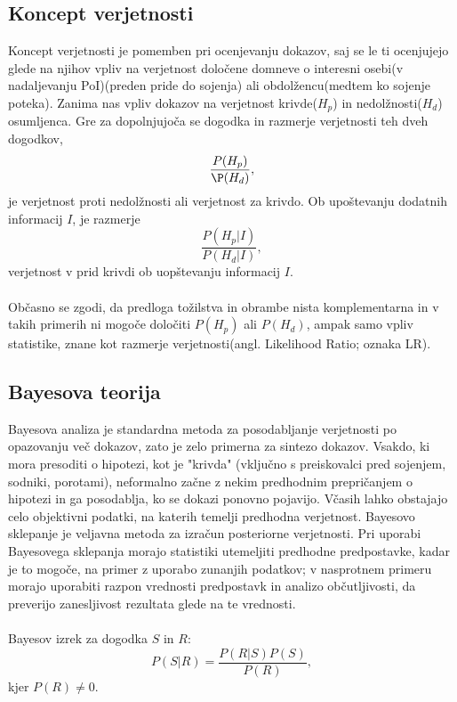 \documentclass[12pt,a4paper]{amsart}
\theoremstyle{definition} %
\theoremstyle{plain} %
\begin{document}
\subsection{Koncept verjetnosti}
Koncept verjetnosti je pomemben pri ocenjevanju dokazov, saj se le ti ocenjujejo glede na njihov vpliv na verjetnost določene domneve o interesni 
osebi(v nadaljevanju PoI)(preden pride do sojenja) ali obdolžencu(medtem ko sojenje poteka). Zanima nas vpliv dokazov na verjetnost krivde($H_p$) in 
nedolžnosti($H_d$) osumljenca. Gre za dopolnjujoča se dogodka in razmerje verjetnosti teh dveh dogodkov, 
\[
    \frac{P(H_p)}{\P(H_d)},
\]
je verjetnost proti nedolžnosti ali verjetnost za krivdo. Ob upoštevanju dodatnih informacij $I$, je razmerje
\[
    \frac{P(H_p \lvert I)}{P(H_d \lvert I)},
\]
verjetnost v prid krivdi ob uopštevanju informacij $I$.\\\\
Občasno se zgodi, da predloga tožilstva in obrambe nista komplementarna in v takih primerih ni mogoče določiti $P(H_p)$ ali $P(H_d)$, ampak samo vpliv statistike, 
znane kot razmerje verjetnosti(angl. Likelihood Ratio; oznaka LR).

\subsection{Bayesova teorija}
Bayesova analiza je standardna metoda za posodabljanje verjetnosti po opazovanju več dokazov, zato je zelo primerna za sintezo dokazov.
Vsakdo, ki mora presoditi o hipotezi, kot je "krivda" (vključno s preiskovalci pred sojenjem, sodniki, porotami), neformalno začne z nekim predhodnim prepričanjem o 
hipotezi in ga posodablja, ko se dokazi ponovno pojavijo. Včasih lahko obstajajo celo objektivni podatki, na katerih temelji predhodna verjetnost. Bayesovo sklepanje je 
veljavna metoda za izračun posteriorne verjetnosti. Pri uporabi Bayesovega sklepanja morajo statistiki utemeljiti predhodne predpostavke, kadar je to mogoče, na primer z 
uporabo zunanjih podatkov; v nasprotnem primeru morajo uporabiti razpon vrednosti predpostavk in analizo občutljivosti, da preverijo zanesljivost rezultata glede na te vrednosti.\\\\
Bayesov izrek za dogodka $S$ in $R$:
\[
    P(S \lvert R) = \frac{P(R \lvert S)P(S)}{P(R)},
\]
kjer $P(R) \ne 0$.

\end{document}
